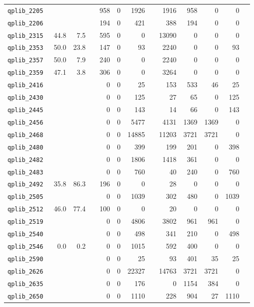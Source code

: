 {\begin{longtable}{lrrrrrrrrrrrr}
{\tt 	qplib\_2205	}	&		&		&	&	958	&	0	&	1926	&	&	1916	&	958	&	0	&	0	\\
{\tt 	qplib\_2206	}	&		&		&	&	194	&	0	&	421	&	&	388	&	194	&	0	&	0	\\
{\tt 	qplib\_2315	}	&	44.8	&	7.5	&	&	595	&	0	&	0	&	&	13090	&	0	&	0	&	0	\\
{\tt 	qplib\_2353	}	&	50.0	&	23.8	&	&	147	&	0	&	93	&	&	2240	&	0	&	0	&	93	\\
{\tt 	qplib\_2357	}	&	50.0	&	7.9	&	&	240	&	0	&	0	&	&	2240	&	0	&	0	&	0	\\
{\tt 	qplib\_2359	}	&	47.1	&	3.8	&	&	306	&	0	&	0	&	&	3264	&	0	&	0	&	0	\\
{\tt 	qplib\_2416	}	&		&		&	&	0	&	0	&	25	&	&	153	&	533	&	46	&	25	\\
{\tt 	qplib\_2430	}	&		&		&	&	0	&	0	&	125	&	&	27	&	65	&	0	&	125	\\
{\tt 	qplib\_2445	}	&		&		&	&	0	&	0	&	143	&	&	14	&	66	&	0	&	143	\\
{\tt 	qplib\_2456	}	&		&		&	&	0	&	0	&	5477	&	&	4131	&	1369	&	1369	&	0	\\
{\tt 	qplib\_2468	}	&		&		&	&	0	&	0	&	14885	&	&	11203	&	3721	&	3721	&	0	\\
{\tt 	qplib\_2480	}	&		&		&	&	0	&	0	&	399	&	&	199	&	201	&	0	&	398	\\
{\tt 	qplib\_2482	}	&		&		&	&	0	&	0	&	1806	&	&	1418	&	361	&	0	&	0	\\
{\tt 	qplib\_2483	}	&		&		&	&	0	&	0	&	760	&	&	40	&	240	&	0	&	760	\\
{\tt 	qplib\_2492	}	&	35.8	&	86.3	&	&	196	&	0	&	0	&	&	28	&	0	&	0	&	0	\\
{\tt 	qplib\_2505	}	&		&		&	&	0	&	0	&	1039	&	&	302	&	480	&	0	&	1039	\\
{\tt 	qplib\_2512	}	&	46.0	&	77.4	&	&	100	&	0	&	0	&	&	20	&	0	&	0	&	0	\\
{\tt 	qplib\_2519	}	&		&		&	&	0	&	0	&	4806	&	&	3802	&	961	&	961	&	0	\\
{\tt 	qplib\_2540	}	&		&		&	&	0	&	0	&	498	&	&	341	&	210	&	0	&	498	\\
{\tt 	qplib\_2546	}	&	0.0	&	0.2	&	&	0	&	0	&	1015	&	&	592	&	400	&	0	&	0	\\
{\tt 	qplib\_2590	}	&		&		&	&	0	&	0	&	25	&	&	93	&	401	&	35	&	25	\\
{\tt 	qplib\_2626	}	&		&		&	&	0	&	0	&	22327	&	&	14763	&	3721	&	3721	&	0	\\
{\tt 	qplib\_2635	}	&		&		&	&	0	&	0	&	176	&	&	0	&	1154	&	384	&	0	\\
{\tt 	qplib\_2650	}	&		&		&	&	0	&	0	&	1110	&	&	228	&	904	&	27	&	1110	\\

\end{longtable}}
